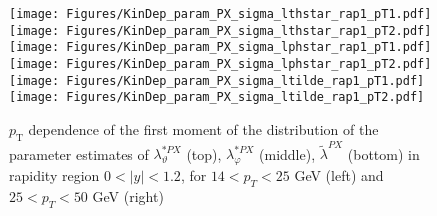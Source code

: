 \documentclass[12pt]{article}
\newcommand{\pT}{p_\mathrm{T}}
\newcommand{\absy}{\left |  y \right |}
\newcommand{\lamtildePX}{\tilde{\lambda}^{\scriptscriptstyle PX}}
\newcommand{\lamthstarPX}{\lambda^{* \scriptscriptstyle PX}_\vartheta}
\newcommand{\lamphstarPX}{\lambda^{* \scriptscriptstyle PX}_\varphi}
\begin{document}
\begin{figure}[htbp]
\centering
\texttt{[image: Figures/KinDep\_param\_PX\_sigma\_lthstar\_rap1\_pT1.pdf]}
\texttt{[image: Figures/KinDep\_param\_PX\_sigma\_lthstar\_rap1\_pT2.pdf]}
\texttt{[image: Figures/KinDep\_param\_PX\_sigma\_lphstar\_rap1\_pT1.pdf]}
\texttt{[image: Figures/KinDep\_param\_PX\_sigma\_lphstar\_rap1\_pT2.pdf]}
\texttt{[image: Figures/KinDep\_param\_PX\_sigma\_ltilde\_rap1\_pT1.pdf]}
\texttt{[image: Figures/KinDep\_param\_PX\_sigma\_ltilde\_rap1\_pT2.pdf]}
\caption{$\pT$ dependence of the first moment of the distribution of the parameter estimates of $\lamthstarPX$ (top), $\lamphstarPX$ (middle), $\lamtildePX$ (bottom) in rapidity region $0<\absy<1.2$, for $14 < p_T < 25$ GeV (left) and
$25 < p_T < 50$ GeV (right)}
\end{figure}
\clearpage
\end{document}
